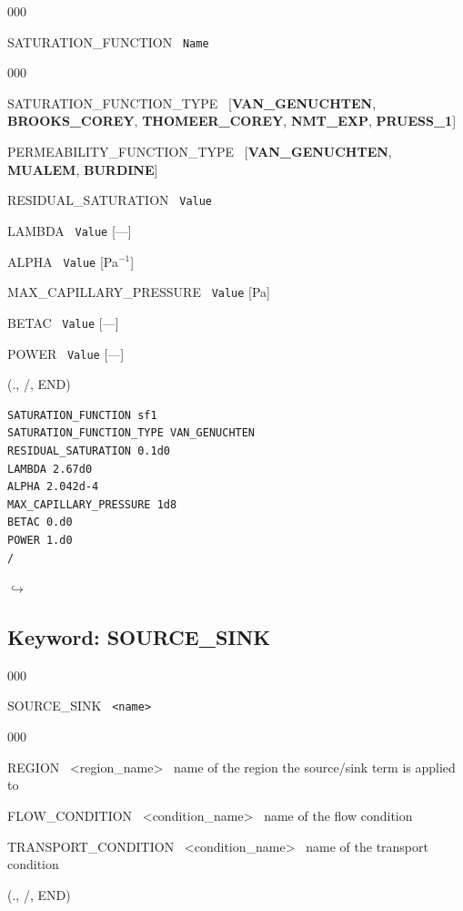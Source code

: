 \documentclass[12pt]{article}
\newcommand\return{{\hfill$\hookrightarrow$}}
\begin{document}
\begin{deflist}{000}
\item[SATURATION\_FUNCTION] \ {\tt Name}

\begin{deflist}{000}
\item[SATURATION\_FUNCTION\_TYPE] \ [{\bf VAN\_GENUCHTEN}, {\bf BROOKS\_COREY}, {\bf THOMEER\_COREY}, {\bf NMT\_EXP}, {\bf PRUESS\_1}]
\item[PERMEABILITY\_FUNCTION\_TYPE] \ [{\bf VAN\_GENUCHTEN}, {\bf MUALEM}, {\bf BURDINE}]
\item[RESIDUAL\_SATURATION] \ {\tt Value}
\item[LAMBDA] \ {\tt Value} [---]
\item[ALPHA] \ {\tt Value} [Pa$^{-1}$]
\item[MAX\_CAPILLARY\_PRESSURE] \ {\tt Value} [Pa]
\item[BETAC] \ {\tt Value} [---]
\item[POWER] \ {\tt Value} [---]
\end{deflist}
\item[(., /, END)]
\end{deflist}


\begin{verbatim}
SATURATION_FUNCTION sf1
SATURATION_FUNCTION_TYPE VAN_GENUCHTEN
RESIDUAL_SATURATION 0.1d0
LAMBDA 2.67d0
ALPHA 2.042d-4
MAX_CAPILLARY_PRESSURE 1d8
BETAC 0.d0
POWER 1.d0
/
\end{verbatim}

\hyperlink{target_key}{\return}


\newpage
\protect\hypertarget{target_src}{}

\subsection{Keyword: SOURCE\_SINK}
\begin{deflist}{000}
\item[SOURCE\_SINK] \ {\tt <name>}
\begin{deflist}{000}
\item[REGION] \ <region\_name> \ name of the region the source/sink term is applied to
\item[FLOW\_CONDITION] \ <condition\_name> \ name of the flow condition
\item[TRANSPORT\_CONDITION] \ <condition\_name> \ name of the transport condition
\end{deflist}
\item[(., /, END)]
\end{deflist}
\end{document}
